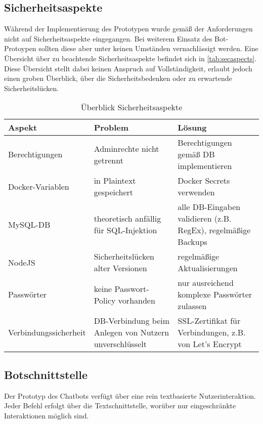 \subsection{Sicherheitsaspekte}

Während der Implementierung des Prototypen wurde gemäß der Anforderungen nicht auf Sicherheitsaspekte eingegangen. Bei weiterem Einsatz des Bot-Protoypen sollten diese aber unter keinen Umständen vernachlässigt werden. Eine Übersicht über zu beachtende Sicherheitsaspekte befindet sich in \autoref{tab:secaspects}. Diese Übersicht stellt dabei keinen Anspruch auf Vollständigkeit, erlaubt jedoch einen groben Überblick, über die Sicherheitsbedenken oder zu erwartende Sicherheitslücken.

\begin{table}[h]
    \centering
    \begin{tabularx}{\textwidth}{|X|X|X|}
        \hline
        \textbf{Aspekt} & \textbf{Problem} & \textbf{Lösung} \\
        \hline
        Berechtigungen & Adminrechte nicht getrennt & Berechtigungen gemäß DB implementieren \\
        \hline
        Docker-Variablen & in Plaintext gespeichert & Docker Secrets verwenden \\
        \hline
        MySQL-DB & theoretisch anfällig für SQL-Injektion & alle DB-Eingaben validieren (z.B. RegEx), regelmäßige Backups \\
        \hline
        NodeJS & Sicherheitslücken alter Versionen & regelmäßige Aktualisierungen \\
        \hline
        Passwörter & keine Passwort-Policy vorhanden & nur ausreichend komplexe Passwörter zulassen \\
        \hline
        Verbindungssicherheit & DB-Verbindung beim Anlegen von Nutzern unverschlüsselt & SSL-Zertifikat für Verbindungen, z.B. von Let's Encrypt \\
        \hline
    \end{tabularx}
    \caption{Überblick Sicherheitsaspekte}
    \label{tab:secaspects}
\end{table}

\subsection{Botschnittstelle}
Der Prototyp des Chatbots verfügt über eine rein textbasierte Nutzerinteraktion. Jeder Befehl erfolgt über die Textschnittstelle, worüber nur eingeschränkte Interaktionen möglich sind.

